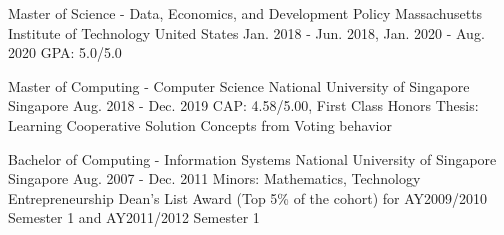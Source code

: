 

\begin{cventries}

  \cventry
    {Master of Science - Data, Economics, and Development Policy} %
    {Massachusetts Institute of Technology} %
    {United States} %
    {Jan. 2018 - Jun. 2018, Jan. 2020 - Aug. 2020} %
    {
      GPA: 5.0/5.0
    }

  \cventry
    {Master of Computing - Computer Science} %
    {National University of Singapore} %
    {Singapore} %
    {Aug. 2018 - Dec. 2019} %
    {
      CAP: 4.58/5.00, First Class Honors\newline
      Thesis: Learning Cooperative Solution Concepts from Voting behavior
    }

  \cventry
    {Bachelor of Computing - Information Systems} %
    {National University of Singapore} %
    {Singapore} %
    {Aug. 2007 - Dec. 2011} %
    {
      Minors: Mathematics, Technology Entrepreneurship\newline
      Dean’s List Award (Top 5\% of the cohort) for AY2009/2010 Semester 1 and AY2011/2012 Semester 1
    }

\end{cventries}
